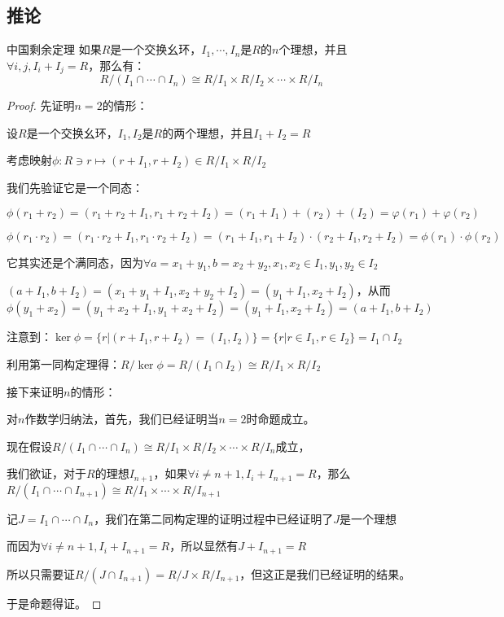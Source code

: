 \documentclass[12pt, a4paper, oneside, UTF8]{ctexbook}
\begin{document}
		\subsection{推论}
			\begin{them}{中国剩余定理}{}
				如果$R$是一个交换幺环，$I_1,\cdots,I_n$是$R$的$n$个理想，并且$\forall i,j,I_i+I_j=R$，那么有：
				\begin{equation}
					R/(I_1 \cap \cdots \cap I_n) \cong R/I_1 \times R/I_2 \times \cdots \times R/I_n
				\end{equation}
			\end{them}
			\begin{proof}
				先证明$n=2$的情形：

				设$R$是一个交换幺环，$I_1,I_2$是$R$的两个理想，并且$I_1+I_2=R$

				考虑映射$\phi : R \ni r \mapsto (r+I_1,r+I_2) \in R/I_1 \times R/I_2$

				我们先验证它是一个同态：

				$\phi (r_1+r_2)=(r_1+r_2+I_1,r_1+r_2+I_2)=(r_1+I_1)+(r_2)+(I_2)=\varphi (r_1)+\varphi (r_2)$
			
				$\phi (r_1\cdot r_2)=(r_1\cdot r_2+I_1,r_1\cdot r_2+I_2)=(r_1+I_1,r_1+I_2)\cdot (r_2+I_1,r_2+I_2)=\phi (r_1)\cdot \phi (r_2)$
			
				它其实还是个满同态，因为$\forall a=x_1+y_1,b=x_2+y_2,x_1,x_2 \in I_1,y_1,y_2 \in I_2$

				$(a+I_1,b+I_2)=(x_1+y_1+I_1,x_2+y_2+I_2)=(y_1+I_1,x_2+I_2)$，从而$\phi (y_1+x_2)=(y_1+x_2+I_1,y_1+x_2+I_2)=(y_1+I_1,x_2+I_2)=(a+I_1,b+I_2)$
				
				注意到：$\ker \phi =\{r|(r+I_1,r+I_2)=(I_1,I_2)\}=\{r| r \in I_1,r \in I_2\}=I_1 \cap I_2$
			
				利用第一同构定理得：$R/\ker \phi = R/(I_1 \cap I_2) \cong R/I_1 \times R/I_2$

				接下来证明$n$的情形：

				对$n$作数学归纳法，首先，我们已经证明当$n=2$时命题成立。

				现在假设$R/(I_1 \cap \cdots \cap I_n) \cong R/I_1 \times R/I_2 \times \cdots \times R/I_n$成立，

				我们欲证，对于$R$的理想$I_{n+1}$，如果$\forall i \neq n+1,I_i + I_{n+1} = R$，那么$R/(I_1 \cap \cdots \cap I_{n+1}) \cong R/I_1 \times  \cdots \times R/I_{n+1}$

				记$J=I_1 \cap \cdots \cap I_n$，我们在第二同构定理的证明过程中已经证明了$J$是一个理想

				而因为$\forall i \neq {n+1},I_i + I_{n+1} = R$，所以显然有$J+I_{n+1}=R$

				所以只需要证$R/(J\cap I_{n+1})=R/J \times R/I_{n+1}$，但这正是我们已经证明的结果。

				于是命题得证。
			\end{proof}
\end{document}
